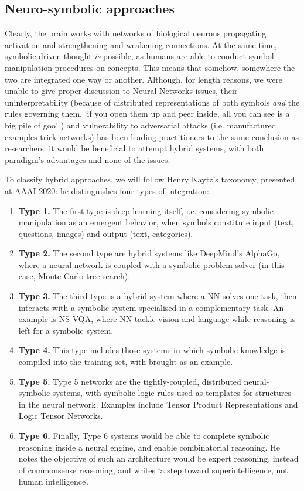 \documentclass[../main.tex]{subfiles}
\begin{document}
\subsection{Neuro-symbolic approaches}
Clearly, the brain works with networks of biological neurons propagating activation and strengthening and weakening connections. At the same time, symbolic-driven thought \textit{is} possible, as humans are able to conduct symbol manipulation procedures on concepts. This means that somehow, somewhere the two are integrated one way or another. Although, for length reasons, we were unable to give proper discussion to Neural Networks issues, their uninterpretability (because of distributed representations of both symbols \textit{and} the rules governing them, \enquote*{if you open them up and peer inside,  all you can see is a big  pile of goo} \cite{mozerUsingRelevanceReduce1989}) and vulnerability to adversarial attacks (i.e. manufactured examples trick networks) has been leading practitioners to the same conclusion as researchers: it would be beneficial to attempt hybrid systems, with both paradigm's advantages and none of the issues.

To classify hybrid approaches, we will follow Henry Kaytz's taxonomy, presented at AAAI 2020\cite{kautzAAAI2020TalkSlides2020}: he distinguishes four types of integration:
\begin{enumerate}
    \item \textbf{Type 1.} The first type is deep learning itself, i.e. considering symbolic manipulation as an emergent behavior, when symbols constitute input (text, questions, images) and output (text, categories).
    \item \textbf{Type 2.} The second type are hybrid systems like DeepMind's AlphaGo, where a neural network is coupled with a symbolic problem solver (in this case, Monte Carlo tree search).
    \item \textbf{Type 3.} The third type is a hybrid system where a NN solves one task, then interacts with a symbolic system specialised in a complementary task. An example is NS-VQA\cite{yiNeuralsymbolicVQADisentangling2018}, where NN tackle vision and language while reasoning is left for a symbolic system.
    \item \textbf{Type 4.} This type includes those systems in which symbolic knowledge is compiled into the training set, with \cite{lampleDeepLearningSymbolic2019} brought as an example.
    \item \textbf{Type 5.} Type 5 networks are the tightly-coupled, distributed neural-symbolic systems, with symbolic logic rules used as templates for structures in the neural network. Examples include Tensor Product Representations\cite{mccoyRNNsImplicitlyImplement2019} and Logic Tensor Networks\cite{serafiniLogicTensorNetworks2016}.
    \item \textbf{Type 6.} Finally, Type 6 systems would be able to complete symbolic reasoning inside a neural engine, and enable combinatorial reasoning. He notes the objective of such an architecture would be expert reasoning, instead of commonsense reasoning, and writes \enquote*{a step toward superintelligence, not human intelligence}.
\end{enumerate}
\end{document}
